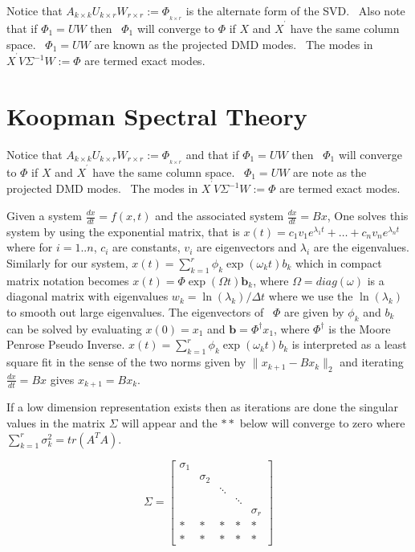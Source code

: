\documentclass[12pt]{report}
\begin{document}
Notice that $A_{k\times k}U_{k\times r}W_{r\times r}:=\Phi _{_{k\times r}}$
is the alternate form of the SVD. \ Also note that if  $\Phi _{1}=UW$ then \ 
$\Phi _{1}$ will converge to $\Phi $ if $X$ and $X^{^{\prime }}$ have the
same column space. \ $\Phi _{1}=UW$ are known as the projected DMD modes. \
The modes in $X^{^{\prime }}V\Sigma ^{-1}W:=\Phi $ are termed exact modes.

\section{Koopman Spectral Theory}

Notice that $A_{k\times k}U_{k\times r}W_{r\times r}:=\Phi _{_{k\times r}}$
and that if $\Phi _{1}=UW$ then \ $\Phi _{1}$ will converge to $\Phi $
if $X$ and $X^{^{\prime }}$ have the same column space. \ $\Phi _{1}=UW$ are
note as the projected DMD modes. \ The modes in $X^{^{\prime }}V\Sigma
^{-1}W:=\Phi $ are termed exact modes. 

Given a system $\frac{dx}{dt}=f(x,t)$ and the associated system $\frac{dx}{dt%
}=Bx$, One solves this system by using the exponential matrix, that is $%
x(t)=c_{1}v_{1}e^{\lambda _{1}t}+\ldots +c_{n}v_{n}e^{\lambda _{n}t}$ where
for $i=1..n$, $c_{i}$ are constants, $v_{i}$ are eigenvectors and $\lambda
_{i}$ are the eigenvalues. Similarly for our system, $x(t)=\sum \limits_{k=1}^{r}\phi _{k}\exp (\omega_{k}t)b_{k}$ which in compact matrix
notation becomes $x(t)=\Phi \exp (\Omega t)\mathbf{b}_{k}$, where $\Omega
=diag(\omega)$ is a diagonal matrix with eigenvalues $w_{k}=\ln (\lambda
_{k})/\Delta t$ where we use the $\ln (\lambda _{k})$ to smooth out large
eigenvalues. The eigenvectors of \ $\Phi $ are given by $\phi _{k}$ and $b_{k}$ can be solved by evaluating $x(0)=x_{1}$ and $\mathbf{b}=\Phi
^{\dagger}x_{1}$, where $\Phi ^{\dagger}$ is the Moore Penrose Pseudo Inverse. $x(t)=\sum\limits_{k=1}^{r}\phi _{k}\exp (\omega_{k}t)b_{k}$ is interpreted as a least square fit in the sense of the two norms given by $\parallel x_{k+1}-Bx_{k}\parallel _{2}$ and iterating $\frac{dx}{dt}=Bx$ gives $x_{k+1}=Bx_{k}.$ 

If a low dimension representation exists then as iterations are done the singular values in the matrix $\Sigma $ will appear and the $\ast \ast $ below will converge to zero where $\sum\limits_{k=1}^{r}\sigma_{k}^{2}=tr(A^{T}A).$

\begin{equation}
    \Sigma =%
    \begin{bmatrix}
    \sigma _{1} &  &  &  &  \\ 
    & \sigma _{2} &  &  &  \\ 
    &  & \ddots &  &  \\ 
    &  &  & \ddots &  \\ 
    &  &  &  & \sigma _{r} \\ 
    \ast  & \ast  & \ast  & \ast  & \ast  \\ 
    \ast  & \ast  & \ast  & \ast  & \ast 
    \end{bmatrix}
\end{equation}
\end{document}
